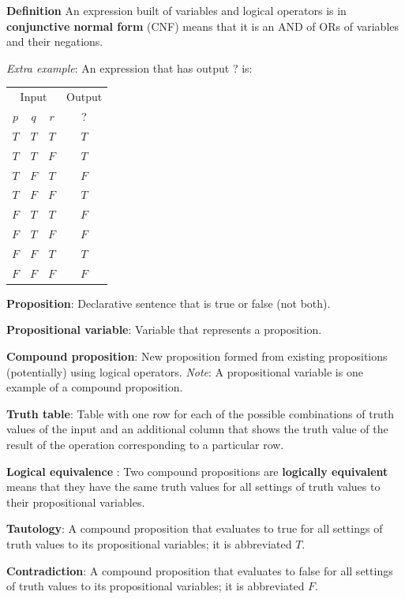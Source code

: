 \documentclass[12pt, oneside]{article}
\begin{document}
{\bf  Definition} An expression built of variables and logical 
operators is in {\bf conjunctive normal form}  (CNF) means
that it is an AND of ORs of variables and their negations.
 



{\it Extra example}: An expression that has output ? is: 

\begin{tabular}{ccc||c}
    \multicolumn{3}{c||}{Input}  & Output\\
    $p$ & $q$ & $r$  &  ?\\
    \hline
    $T$ & $T$  & $T$ & $T$ \\
    $T$ & $T$  & $F$ & $T$ \\
    $T$ & $F$  & $T$ & $F$ \\
    $T$ & $F$  & $F$ & $T$ \\
    $F$ & $T$  & $T$ & $F$ \\
    $F$ & $T$  & $F$ & $F$ \\
    $F$ & $F$  & $T$ & $T$ \\
    $F$ & $F$  & $F$ & $F$ \\
\end{tabular}

\vfill

 \newpage


{\bf Proposition}: Declarative sentence that is true or false (not both).

{\bf Propositional variable}: Variable that represents a proposition.

{\bf Compound proposition}: New proposition formed from existing propositions (potentially) using logical operators.
{\it Note}: A propositional variable is one example of a compound proposition.

{\bf Truth table}: Table with one row for each of the possible combinations of truth values of the input and 
    an additional column that shows the truth value of the result of the operation corresponding to a particular row.
    
 

{\bf Logical equivalence }: Two compound  propositions are {\bf logically  equivalent} means that  they 
have the  same  truth  values for all settings of truth  values to their propositional  variables.

{\bf Tautology}:  A compound proposition that evaluates to true
for all settings of truth  values to its propositional  variables; it is  abbreviated $T$.

{\bf Contradiction}: A compound proposition that  evaluates  to  false 
for  all settings of truth  values to its propositional  variables; it  is abbreviated $F$.
\end{document}
